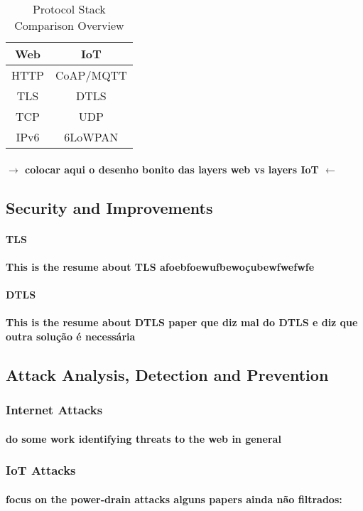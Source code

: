 \begin{table}[h]
	\centering
	\begin{center} \caption{Protocol Stack Comparison Overview } \end{center}
	\label{tab:stack}
	\begin{tabular}{c|c}
		Web & IoT \\
		\hline
		\ac{HTTP} & \ac{CoAP}/\ac{MQTT} \\
		\ac{TLS} & \ac{DTLS} \\
		\ac{TCP} & \ac{UDP} \\
		IPv6 & 6LoWPAN 
	\end{tabular}
\end{table}


\paragraph{
	$\rightarrow$ colocar aqui o desenho bonito das layers web vs layers IoT $\leftarrow$
}

\subsection{Security and Improvements}

\paragraph{\textbf{\ac{TLS}}}
\paragraph{
	This is the resume about TLS afoebfoewufbewoçubewfwefwfe
}

\paragraph{\textbf{\ac{DTLS}}}
\paragraph{
	This is the resume about DTLS
	paper que diz mal do \ac{DTLS} \cite{Alghamdi2013} e diz que outra solução é necessária
}

\subsection{Attack Analysis, Detection and Prevention}

\subsubsection{Internet Attacks}
\paragraph{
do some work identifying threats to the web in general
}
\subsubsection{IoT Attacks}
\paragraph{
	focus on the power-drain attacks
	alguns papers ainda não filtrados: \cite{Vasserman2013,Vanitha2014}
}
